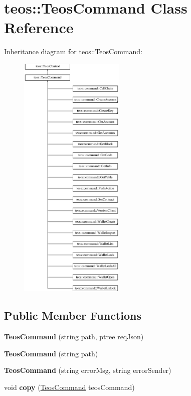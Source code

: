 \hypertarget{classteos_1_1_teos_command}{}\section{teos\+:\+:Teos\+Command Class Reference}
\label{classteos_1_1_teos_command}
Inheritance diagram for teos\+:\+:Teos\+Command\+:\begin{figure}[H]
\begin{center}
\leavevmode
\includegraphics[height=12.000000cm]{classteos_1_1_teos_command}
\end{center}
\end{figure}
\subsection*{Public Member Functions}
\begin{DoxyCompactItemize}
\item 
\mbox{\label{classteos_1_1_teos_command_a914843fee0b714f96176109cafee4014}} 
{\bfseries Teos\+Command} (string path, ptree req\+Json)
\item 
\mbox{\label{classteos_1_1_teos_command_a2b68fe1c3c46f20a1e28e6f468c0a8e0}} 
{\bfseries Teos\+Command} (string path)
\item 
\mbox{\label{classteos_1_1_teos_command_a0d0b0d10829ec7178ba2f9f85db2b67f}} 
{\bfseries Teos\+Command} (string error\+Msg, string error\+Sender)
\item 
\mbox{\label{classteos_1_1_teos_command_a3728e4e87c485b4acb46f0d5c88595ad}} 
void {\bfseries copy} (\mbox{\hyperlink{classteos_1_1_teos_command}{Teos\+Command}} teos\+Command)
\end{DoxyCompactItemize}

